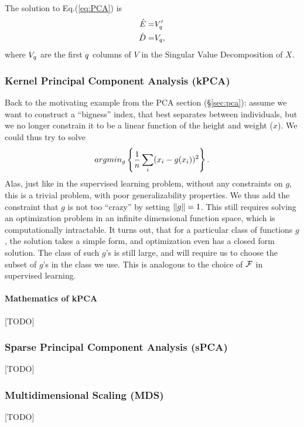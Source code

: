 The solution to Eq.(\ref{eq:PCA}) is 
\begin{align}
\label{eq:PCA_solution}
	\hat{E} =& V_q' \\
	\hat{D} =& V_q,
\end{align}
where $V_q$ are the first $q$ columns of $V$ in the Singular Value Decomposition of $X$.





\subsubsection{Kernel Principal Component Analysis (kPCA)}
Back to the motivating example from the PCA section (\S\ref{sec:pca}): assume we want to construct a ``bigness'' index, that best separates between individuals, but we no longer constrain it to be a linear function of the height and weight ($x$).
We could thus try to solve 
\begin{align}
\label{eq:kpca_wrong}
	argmin_{g}\left\{ \frac{1}{n}\sum_i (x_i-g(x_i) )^2 \right\} .
\end{align}
Alas, just like in the supervised learning problem, without any constraints on $g$, this is a trivial problem, with poor generalizability properties.
We thus add the constraint that $g$ is not too ``crazy'' by setting $\Vert g \Vert=1$.
This still requires solving an optimization problem in an infinite dimensional function space, which is computationally intractable. 
It turns out, that for a particular class of functions $g$, the solution takes a simple form, and optimization even has a closed form solution. The class of such $g$'s is still large, and will require us to choose the subset of $g$'s in the class we use. 
This is analogous to the choice of $\mathcal{F}$ in supervised learning.


\paragraph{Mathematics of kPCA}
[TODO]


\subsubsection{Sparse Principal Component Analysis (sPCA)}
[TODO]



\subsubsection{Multidimensional Scaling (MDS)}
\label{sec:MDS}
[TODO]


